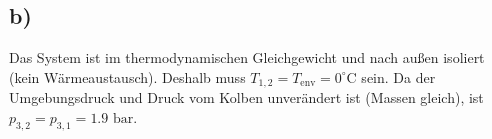 

\subsection*{b)}
Das System ist im thermodynamischen Gleichgewicht und nach außen isoliert (kein Wärmeaustausch). Deshalb muss $T_{1,2} = T_{\text{env}} = 0^\circ \text{C}$ sein. Da der Umgebungsdruck und Druck vom Kolben unverändert ist (Massen gleich), ist $p_{3,2} = p_{3,1} = 1.9 \text{ bar}$.